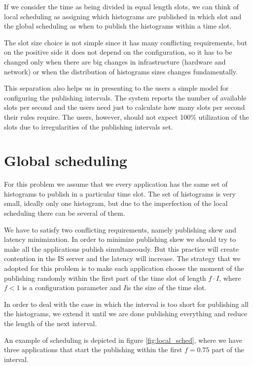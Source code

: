 If we consider the time as being divided in equal length slots, we can think of local scheduling as assigning which histograms are published in which slot and the global scheduling as when to publish the histograms within a time slot. 

The slot size choice is not simple since it has many conflicting requirements, but on the positive side it does not depend on the configuration, so it has to be changed only when there are big changes in infrastructure (hardware and network) or when the distribution of histograms sizes changes fundamentally.

This separation also helps us in presenting to the users a simple model for configuring the publishing intervals. The system reports the number of available slots per second and the users need just to calculate how many slots per second their rules require. The users, however, should not expect 100\% utilization of the slots due to irregularities of the publishing intervals set.

\section*{Global scheduling}

For this problem we assume that we every application has the same set of histograms to publish in a particular time slot. The set of histograms is very small, ideally only one histogram, but due to the imperfection of the local scheduling there can be several of them.

We have to satisfy two conflicting requirements, namely publishing skew and latency minimization. In order to minimize publishing skew we should try to make all the applications publish simultaneously. But this practice will create contention in the IS server and the latency will increase. 
The strategy that we adopted for this problem is to make each application choose the moment of the publishing randomly within the first part of the time slot of length $f\cdot I$, where $f<1$ is a configuration parameter and $I$is the size of the time slot.

In order to deal with the case in which the interval is too short for publishing all the histograms, we extend it until we are done publishing everything and reduce the length of the next interval.

An example of scheduling is depicted in figure \ref{fig:local_sched}, where we have three applications that start the publishing within the first $f=0.75$ part of the interval.

